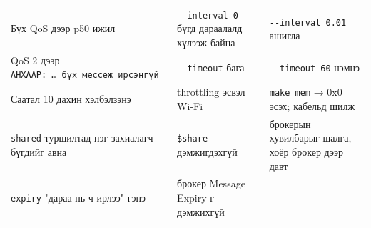 \begin{longtable}[]{@{}lll@{}}
\begin{minipage}[t]{0.30\columnwidth}
Бүх QoS дээр p50 ижил\strut
\end{minipage} & \begin{minipage}[t]{0.30\columnwidth}\raggedright
\texttt{-\/-interval\ 0} --- бүгд дараалалд хүлээж байна\strut
\end{minipage} & \begin{minipage}[t]{0.30\columnwidth}\raggedright
\texttt{-\/\allowbreak{}-interval\ 0.\allowbreak{}01} ашигла\strut
\end{minipage}\tabularnewline
\begin{minipage}[t]{0.30\columnwidth}\raggedright
QoS 2 дээр \texttt{АНХААР:\allowbreak{}\ \ldots{}\ бүх\ мессеж\ ирсэнгүй}\strut
\end{minipage} & \begin{minipage}[t]{0.30\columnwidth}\raggedright
\texttt{-\/-timeout} бага\strut
\end{minipage} & \begin{minipage}[t]{0.30\columnwidth}\raggedright
\texttt{-\/-timeout\ 60} нэмнэ\strut
\end{minipage}\tabularnewline
\begin{minipage}[t]{0.30\columnwidth}\raggedright
Саатал 10 дахин хэлбэлзэнэ\strut
\end{minipage} & \begin{minipage}[t]{0.30\columnwidth}\raggedright
throttling эсвэл Wi-Fi\strut
\end{minipage} & \begin{minipage}[t]{0.30\columnwidth}\raggedright
\texttt{make\ mem} → 0x0 эсэх; кабельд шилж\strut
\end{minipage}\tabularnewline
\begin{minipage}[t]{0.30\columnwidth}\raggedright
\texttt{shared} туршилтад нэг захиалагч бүгдийг авна\strut
\end{minipage} & \begin{minipage}[t]{0.30\columnwidth}\raggedright
\texttt{\$share} дэмжигдэхгүй\strut
\end{minipage} & \begin{minipage}[t]{0.30\columnwidth}\raggedright
брокерын хувилбарыг шалга, хоёр брокер дээр давт\strut
\end{minipage}\tabularnewline
\begin{minipage}[t]{0.30\columnwidth}\raggedright
\texttt{expiry} "дараа нь ч ирлээ" гэнэ\strut
\end{minipage} & \begin{minipage}[t]{0.30\columnwidth}\raggedright
брокер Message Expiry-г дэмжихгүй\strut

\end{minipage}
\end{longtable}
